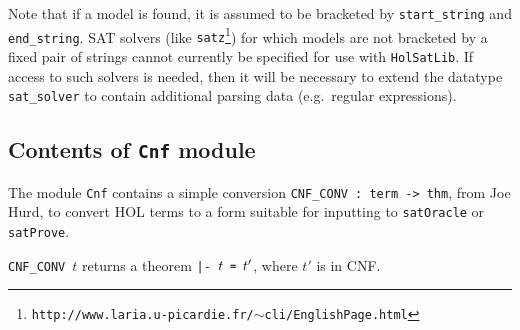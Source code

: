 \documentclass[12pt]{article}
\renewcommand{\t}[1]{\mbox{\small\tt #1}}
\newcommand\HOL{HOL\xspace}
\begin{document}
\medskip

Note that if a model is found, it is assumed to be bracketed
by \t{start\_string} and \t{end\_string}. SAT solvers 
(like {\tt satz}\footnote{\tt http://www.laria.u-picardie.fr/\mbox{\small$\sim$}cli/EnglishPage.html})
for which models are not bracketed by a fixed pair of strings cannot currently
be specified for use with {\tt HolSatLib}. If access to such solvers is needed, then
it will be necessary to extend the datatype \t{sat\_solver} to contain
additional parsing data (e.g.~regular expressions).

\subsection{Contents of {\tt Cnf} module}

The module {\tt Cnf} contains a simple conversion {\small\verb+CNF_CONV : term -> thm+}, 
from Joe Hurd, to convert
\HOL terms to a form suitable for inputting to \t{satOracle} or \t{satProve}.

{\small\verb+CNF_CONV+}~$t$ returns a theorem {\small\verb+|- +}$t\t{~=~}t'$,
where $t'$ is in CNF.
\end{document}
